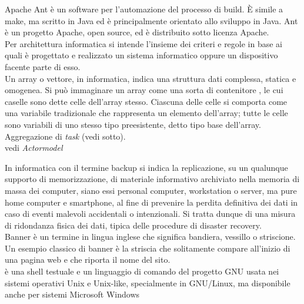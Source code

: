 \documentclass{scalatekids-article}
\begin{document}
 Apache Ant è un software per l'automazione del processo di build. È simile a make, ma scritto in Java ed è principalmente orientato allo sviluppo in Java. Ant è un progetto Apache, open source, ed è distribuito sotto licenza Apache.
\\

 Per architettura informatica si intende l'insieme dei criteri e regole in base ai quali è progettato e realizzato un sistema informatico oppure un dispositivo facente parte di esso.
\\

 Un array o vettore, in informatica, indica una struttura dati complessa, statica e omogenea. Si può immaginare un array come una sorta di contenitore , le cui caselle sono dette celle dell'array stesso. Ciascuna delle celle si comporta come una variabile tradizionale che rappresenta un elemento dell'array; tutte le celle sono variabili di uno stesso tipo preesistente, detto tipo base dell'array.
\\

 Aggregazione di \textit{task} (vedi sotto).
\\

 vedi \textit{Actormodel}
\\


 In informatica con il termine backup si indica la replicazione, su un qualunque supporto di memorizzazione, di materiale informativo archiviato nella memoria di massa dei computer, siano essi personal computer, workstation o server, ma pure home computer e smartphone, al fine di prevenire la perdita definitiva dei dati in caso di eventi malevoli accidentali o intenzionali. Si tratta dunque di una misura di ridondanza fisica dei dati, tipica delle procedure di disaster recovery.
\\

 Banner è un termine in lingua inglese che significa bandiera, vessillo o striscione. Un esempio classico di banner è la striscia che solitamente compare all'inizio di una pagina web e che riporta il nome del sito.
\\

 è una shell testuale e un linguaggio di comando del progetto GNU usata nei sistemi operativi Unix e Unix-like, specialmente in GNU/Linux, ma disponibile anche per sistemi Microsoft Windows
\\
\end{document}

